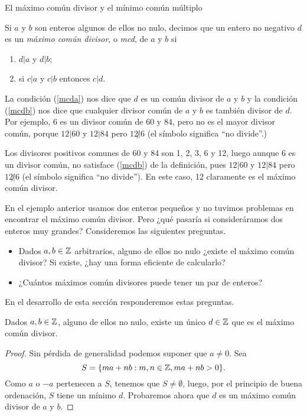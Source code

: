 \begin{section}{El máximo común divisor y el mínimo común
múltiplo}\label{1.7}

\begin{definicion}\label{mcd} Si $a$ y $b$ son enteros algunos de ellos no nulo, decimos que un entero no negativo $d$ es un {\em máximo común divisor}, o {\em mcd}, de $a$ y $b$ si
\begin{enumerate}[label=(\alph*)]
\item\label{mcda} $ d|a$  y $d|b$;
\item\label{mcdb}  si $ c|a $ y $c|b$ entonces $ c|d$.
\end{enumerate}
\end{definicion}
La condición (\ref{mcda}) nos dice que $d$ es un común divisor de $a$ y $b$ y la condición (\ref{mcdb}) nos dice que cualquier divisor común de
$a$ y $b$ es también divisor de $d$. Por ejemplo, $6$ es un divisor común de $60$ y $84$, pero no es el mayor divisor común, porque
$12|60$ y $12|84$ pero $12{\not|}6$ (el símbolo significa ``no divide''.)



\begin{ejemplo} \label{ejem-1-mcd}
	Los divisores positivos comunes de 60  y 84 son 1, 2, 3, 6 y 12, luego aunque 6  es un divisor común, no satisface (\ref{mcdb}) de la definición, pues $12|60$ y $12|84$ pero $12{\not|}6$ (el símbolo significa ``no divide''). En este caso, 12  claramente es  el  máximo común divisor.
\end{ejemplo}

En el ejemplo anterior usamos dos enteros pequeños y no tuvimos problemas en encontrar el  máximo común divisor. Pero ¿qué pasaría si consideráramos dos enteros muy grandes? Consideremos las siguientes preguntas.
\begin{itemize}
	\item Dados $a,b \in {\mathbb Z}$ arbitrarios, alguno de ellos no nulo ¿existe el máximo común divisor? Si existe, ¿hay una forma eficiente de calcularlo?
	\item  ¿Cuántos máximos común divisores puede tener un  par de enteros?
\end{itemize}
En  el desarrollo de esta sección responderemos estas preguntas. 


\begin{teorema}
	Dados $a,b \in {\mathbb Z}$, alguno de ellos no nulo, existe un único $d \in {\mathbb Z}$ que es el máximo común divisor. 
\end{teorema}
\begin{proof}
	Sin pérdida de generalidad podemos suponer que  $a \ne 0$. Sea 
	\begin{equation*}
	S = \{m a+n b : m,n\in {\mathbb Z}, m a+n b>0\}.
	\end{equation*}
	Como  $a$ o $-a$ pertenecen a $S$, tenemos que  $S \not= \emptyset$, luego, por el principio de buena ordenación, $S$ tiene un  mínimo $d$. Probaremos ahora que  $d$  es un  máximo común divisor de $a$ y $b$. 
	

\end{proof}
\end{section}
